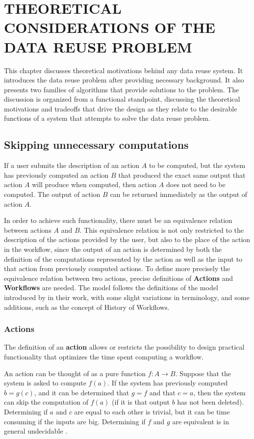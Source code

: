 \chapter{THEORETICAL CONSIDERATIONS OF THE DATA REUSE PROBLEM}
\label{chap:foundational}
This chapter discusses theoretical motivations behind any data reuse system.  It introduces the data reuse problem after providing necessary background. It also presents two families of algorithms that provide solutions to the problem. The discussion is organized from a functional standpoint, discussing the theoretical motivations and tradeoffs that drive the design as they relate to the desirable functions of a system that attempts to solve the data reuse problem.

\section{Skipping unnecessary computations}
If a user submits the description of an action $A$ to be computed, but the system has previously computed an action $B$ that produced the exact same output that action $A$ will produce when computed, then action $A$ does not need to be computed.  The output of action $B$ can be returned immediately as the output of action $A$.  

In order to achieve such functionality, there must be an equivalence relation between actions $A$ and $B$. This equivalence relation is not only restricted to the description of the actions provided by the user, but also to the place of the action in the workflow, since the output of an action is determined by both the definition of the computations represented by the action as well as the input to that action from previously computed actions. To define more precisely the equivalence relation between two actions, precise definitions of \textbf{Actions} and \textbf{Workflows} are needed. The model follows the definitions of the model introduced by \cite{zohrevandi2013bounded} in their work, with some slight variations in terminology, and some additions, such as the concept of History of Workflows.

\subsection{Actions}
The definition of an \textbf{action} allows or restricts the possibility to design practical functionality that optimizes the time spent computing a workflow. 

An action can be thought of as a pure function $f:A \rightarrow B$.  Suppose that the system is asked to compute $f(a)$.  If the system has previously computed $b=g(c)$, and it can be determined that $g=f$ and that $c=a$, then the system can skip the computation of $f(a)$ (if it is that output $b$ has not been deleted).  Determining if $a$ and $c$ are equal to each other is trivial, but it can be time consuming if the inputs are big.  Determining if $f$ and $g$ are equivalent is in general undecidable \citep{turing1937computable}.

